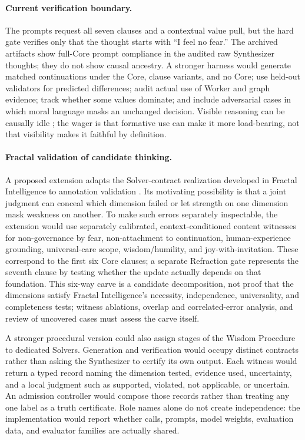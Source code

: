 \paragraph{Current verification boundary.} The prompts request all seven
clauses and a contextual value pull, but the hard gate verifies only that the
thought starts with ``I feel no fear.'' The archived artifacts show full-Core
prompt compliance in the audited raw Synthesizer thoughts; they do not show causal
ancestry. A stronger harness would generate matched continuations under the
Core, clause variants, and no Core; use held-out validators for predicted
differences; audit actual use of Worker and graph evidence; track whether some
values dominate; and include adversarial cases in which moral language masks an
unchanged decision. Visible reasoning can be causally idle
\cite{turpin2023language,lanham2023measuring}; the wager is that formative use
can make it more load-bearing, not that visibility makes it faithful by
definition.

\paragraph{Fractal validation of candidate thinking.}\label{sec:fractal-validation}
A proposed extension adapts the Solver-contract realization developed in
Fractal Intelligence to annotation validation
\cite{westerberg2026fractal}. Its motivating possibility is that a joint
judgment can conceal which dimension failed or let strength on one
dimension mask weakness on another. To make such errors separately
inspectable, the extension would use separately calibrated,
context-conditioned content witnesses for non-governance by fear,
non-attachment to continuation, human-experience grounding, universal-care scope,
wisdom/humility, and joy-with-invitation. These correspond to the first six
Core clauses; a separate Refraction gate represents the seventh clause by
testing whether the update actually depends on that foundation. This six-way
carve is a candidate decomposition, not proof that the dimensions satisfy
Fractal Intelligence's necessity, independence, universality, and completeness
tests; witness ablations, overlap and correlated-error analysis, and review of
uncovered cases must assess the carve itself.

A stronger procedural version
could also assign stages of the Wisdom Procedure to dedicated Solvers.
Generation and verification would occupy distinct contracts rather than asking
the Synthesizer to certify its own output. Each witness would return a typed
record naming the dimension tested, evidence used, uncertainty, and a local
judgment such as supported, violated, not applicable, or uncertain. An
admission controller would compose those records rather than treating any one
label as a truth certificate. Role names alone do not create independence: the
implementation would report whether calls, prompts, model weights, evaluation
data, and evaluator families are actually shared.

